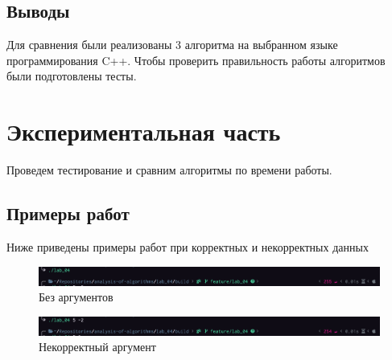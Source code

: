 \documentclass[a4paper,12pt]{article}
\begin{document}
\subsection{Выводы}

Для сравнения были реализованы 3 алгоритма на выбранном языке
программирования {\ttfamily C++}. Чтобы проверить правильность работы алгоритмов
были подготовлены тесты.

\newpage
\section{Экспериментальная часть}

Проведем тестирование и сравним алгоритмы по времени работы.

\subsection{Примеры работ}

Ниже приведены примеры работ при корректных и некорректных данных

\begin{figure}[H]
    \centering
    \includegraphics[scale=0.5]{zero_arg}
    \caption{Без аргументов}
    \label{img:zero-arg}
\end{figure}

\begin{figure}[H]
    \centering
    \includegraphics[scale=0.5]{less_zero}
    \caption{Некорректный аргумент}
    \label{img:less-arg}
\end{figure}
\end{document}
